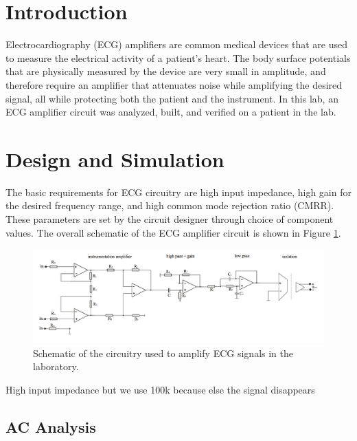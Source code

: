 \documentclass[pdftex,12pt,letterpaper]{article}
\begin{document}
\section{Introduction}

Electrocardiography (ECG) amplifiers are common medical devices that are used to measure the electrical activity of a patient's heart. The body surface potentials that are physically measured by the device are very small in amplitude, and therefore require an amplifier that attenuates noise while amplifying the desired signal, all while protecting both the patient and the instrument. In this lab, an ECG amplifier circuit was analyzed, built, and verified on a patient in the lab.

\section{Design and Simulation}

The basic requirements for ECG circuitry are high input impedance, high gain for the desired frequency range, and high common mode rejection ratio (CMRR). These parameters are set by the circuit designer through choice of component values. The overall schematic of the ECG amplifier circuit is shown in Figure \ref{fig:circuit}.

\begin{figure}[H]
\begin{center}
\includegraphics[scale=.35]{ECG_circuit.png}
\caption{Schematic of the circuitry used to amplify ECG signals in the laboratory.}
\label{fig:circuit}
\end{center}
\end{figure}


High input impedance but we use 100k because else the signal disappears

\subsection{AC Analysis}
\end{document}
